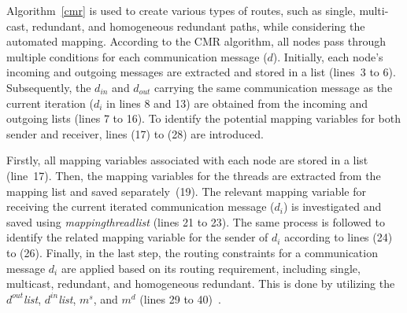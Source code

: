        Algorithm~\ref{cmr} is used to create various types of routes, such as single, multi-cast, redundant, and homogeneous redundant paths, while considering the automated mapping. According to the CMR algorithm, all nodes pass through multiple conditions for each communication message ($d$). Initially, each node's incoming and outgoing messages are extracted and stored in a list (lines~3 to 6). Subsequently, the $d_{in}$ and $d_{out}$ carrying the same communication message as the current iteration ($d_i$ in lines 8 and 13) are obtained from the incoming and outgoing lists (lines 7 to 16). To identify the potential mapping variables for both sender and receiver, lines (17) to (28) are introduced.
    
    

    
    
    
    Firstly, all mapping variables associated with each node are stored in a list (line~17). Then, the mapping variables for the threads are extracted from the mapping list and saved separately~(19). The relevant mapping variable for receiving the current iterated communication message ($d_i$) is investigated and saved using \textit{mappingthread\textunderscore list} (lines 21 to 23). The same process is followed to identify the related mapping variable for the sender of $d_i$ according to lines (24) to (26). Finally, in the last step, the routing constraints for a communication message $d_i$ are applied based on its routing requirement, including single, multicast, redundant, and homogeneous redundant. This is done by utilizing the \textit{$d^{out}$\textunderscore list}, \textit{$d^{in}$\textunderscore list}, $m^s$, and $m^d$ (lines 29 to 40)~\cite{askaripoor2023designer}.
        
        
        
